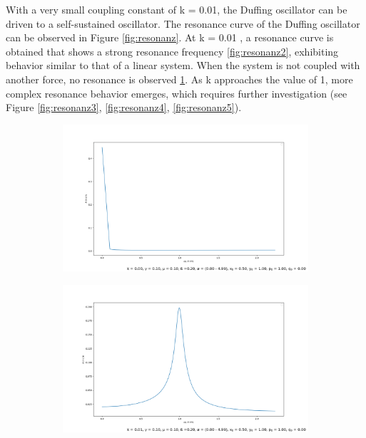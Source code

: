 \documentclass[oneside,10pt,a4paper]{report}
\begin{document}
		With a very small coupling constant of 
		k = 0.01, the Duffing oscillator can be driven to a self-sustained oscillator. The resonance curve of the Duffing oscillator can be observed in Figure \ref{fig:resonanz}. At 
		k = 0.01 , a resonance curve is obtained that shows a strong resonance frequency \ref{fig:resonanz2}, exhibiting behavior similar to that of a linear system. When the system is not coupled with another force, no resonance is observed \ref{fig:resonanz1}. As 
		k approaches the value of 1, more complex resonance behavior emerges, which requires further investigation (see Figure \ref{fig:resonanz3}, \ref{fig:resonanz4}, \ref{fig:resonanz5}).
	\begin{figure}[H]
		\centering
		\begin{subfigure}[b]{0.45\textwidth}
			\includegraphics[width=\textwidth]{resonanz1.png}
			\caption{}
			\label{fig:resonanz1}
		\end{subfigure}
		\hfill
		\begin{subfigure}[b]{0.45\textwidth}
			\includegraphics[width=\textwidth]{resonanz2.png}

\end{subfigure}
\end{figure}
\end{document}
